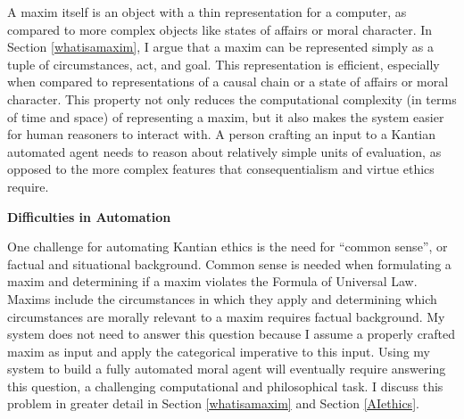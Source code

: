 \begin{isabellebody}
\begin{isamarkuptext}
A maxim itself is an object with a thin representation for a computer, as compared to more complex 
objects like states of affairs or moral character. In Section \ref{whatisamaxim}, I argue that a maxim can be 
represented simply as a tuple of circumstances, act, and goal.
This representation is efficient, especially when compared to representations of a causal 
chain or a state of affairs or moral character. This property not only reduces the computational complexity
(in terms of time and space) of representing a maxim, but it also makes the system easier for human reasoners
to interact with. A person crafting an input to a Kantian automated agent needs to reason about relatively
simple units of evaluation, as opposed to the more complex features that consequentialism and virtue
ethics require.%
\end{isamarkuptext}\isamarkuptrue%
%
\begin{isamarkuptext}%
\noindent \textbf{Difficulties in Automation}%
\end{isamarkuptext}\isamarkuptrue%
%
\begin{isamarkuptext}%
One challenge for automating Kantian ethics is the need for ``common sense'', or factual and 
situational background. Common sense is needed when formulating a maxim and determining if a maxim 
violates the Formula of Universal Law. Maxims include the circumstances in which they apply and
determining which circumstances are morally relevant to a maxim requires factual background. 
My system does not need to answer this question because I assume a properly crafted
maxim as input and apply the categorical imperative to this input. Using my system to build a fully automated
moral agent will eventually require answering this question, a challenging computational and philosophical task. I
discuss this problem in greater detail in Section \ref{whatisamaxim} and Section \ref{AIethics}. 


\end{isamarkuptext}
\end{isabellebody}
